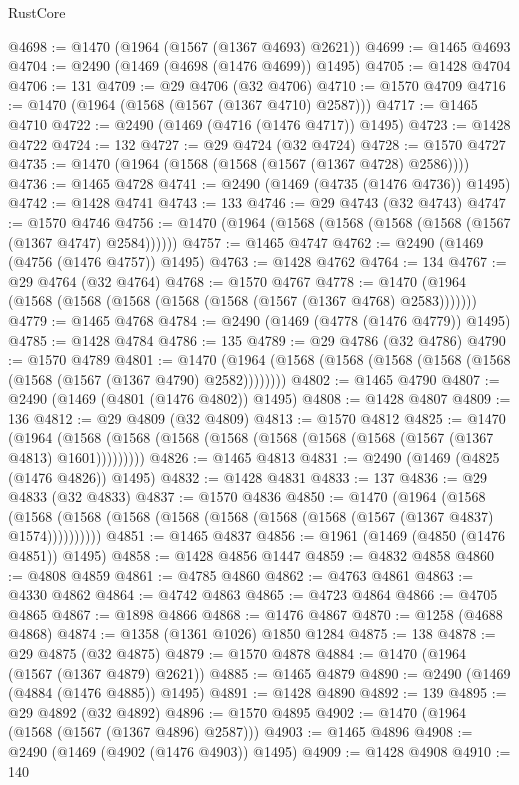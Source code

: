 \begin{lexlean}{RustCore}
\begin{coremodule}
@4698 := @1470 (@1964 (@1567 (@1367 @4693) @2621))
@4699 := @1465 @4693
@4704 := @2490 (@1469 (@4698 (@1476 @4699)) @1495)
@4705 := @1428 @4704
@4706 := 131
@4709 := @29 @4706 (@32 @4706)
@4710 := @1570 @4709
@4716 := @1470 (@1964 (@1568 (@1567 (@1367 @4710) @2587)))
@4717 := @1465 @4710
@4722 := @2490 (@1469 (@4716 (@1476 @4717)) @1495)
@4723 := @1428 @4722
@4724 := 132
@4727 := @29 @4724 (@32 @4724)
@4728 := @1570 @4727
@4735 := @1470 (@1964 (@1568 (@1568 (@1567 (@1367 @4728) @2586))))
@4736 := @1465 @4728
@4741 := @2490 (@1469 (@4735 (@1476 @4736)) @1495)
@4742 := @1428 @4741
@4743 := 133
@4746 := @29 @4743 (@32 @4743)
@4747 := @1570 @4746
@4756 := @1470 (@1964 (@1568 (@1568 (@1568 (@1568 (@1567 (@1367 @4747) @2584))))))
@4757 := @1465 @4747
@4762 := @2490 (@1469 (@4756 (@1476 @4757)) @1495)
@4763 := @1428 @4762
@4764 := 134
@4767 := @29 @4764 (@32 @4764)
@4768 := @1570 @4767
@4778 := @1470 (@1964 (@1568 (@1568 (@1568 (@1568 (@1568 (@1567 (@1367 @4768) @2583)))))))
@4779 := @1465 @4768
@4784 := @2490 (@1469 (@4778 (@1476 @4779)) @1495)
@4785 := @1428 @4784
@4786 := 135
@4789 := @29 @4786 (@32 @4786)
@4790 := @1570 @4789
@4801 := @1470 (@1964 (@1568 (@1568 (@1568 (@1568 (@1568 (@1568 (@1567 (@1367 @4790) @2582))))))))
@4802 := @1465 @4790
@4807 := @2490 (@1469 (@4801 (@1476 @4802)) @1495)
@4808 := @1428 @4807
@4809 := 136
@4812 := @29 @4809 (@32 @4809)
@4813 := @1570 @4812
@4825 := @1470
    (@1964 (@1568 (@1568 (@1568 (@1568 (@1568 (@1568 (@1568 (@1567 (@1367 @4813) @1601)))))))))
@4826 := @1465 @4813
@4831 := @2490 (@1469 (@4825 (@1476 @4826)) @1495)
@4832 := @1428 @4831
@4833 := 137
@4836 := @29 @4833 (@32 @4833)
@4837 := @1570 @4836
@4850 := @1470
    (@1964
      (@1568 (@1568 (@1568 (@1568 (@1568 (@1568 (@1568 (@1568 (@1567 (@1367 @4837) @1574))))))))))
@4851 := @1465 @4837
@4856 := @1961 (@1469 (@4850 (@1476 @4851)) @1495)
@4858 := @1428 @4856 @1447
@4859 := @4832 @4858
@4860 := @4808 @4859
@4861 := @4785 @4860
@4862 := @4763 @4861
@4863 := @4330 @4862
@4864 := @4742 @4863
@4865 := @4723 @4864
@4866 := @4705 @4865
@4867 := @1898 @4866
@4868 := @1476 @4867
@4870 := @1258 (@4688 @4868)
@4874 := @1358 (@1361 @1026) @1850 @1284
@4875 := 138
@4878 := @29 @4875 (@32 @4875)
@4879 := @1570 @4878
@4884 := @1470 (@1964 (@1567 (@1367 @4879) @2621))
@4885 := @1465 @4879
@4890 := @2490 (@1469 (@4884 (@1476 @4885)) @1495)
@4891 := @1428 @4890
@4892 := 139
@4895 := @29 @4892 (@32 @4892)
@4896 := @1570 @4895
@4902 := @1470 (@1964 (@1568 (@1567 (@1367 @4896) @2587)))
@4903 := @1465 @4896
@4908 := @2490 (@1469 (@4902 (@1476 @4903)) @1495)
@4909 := @1428 @4908
@4910 := 140

\end{coremodule}
\end{lexlean}
